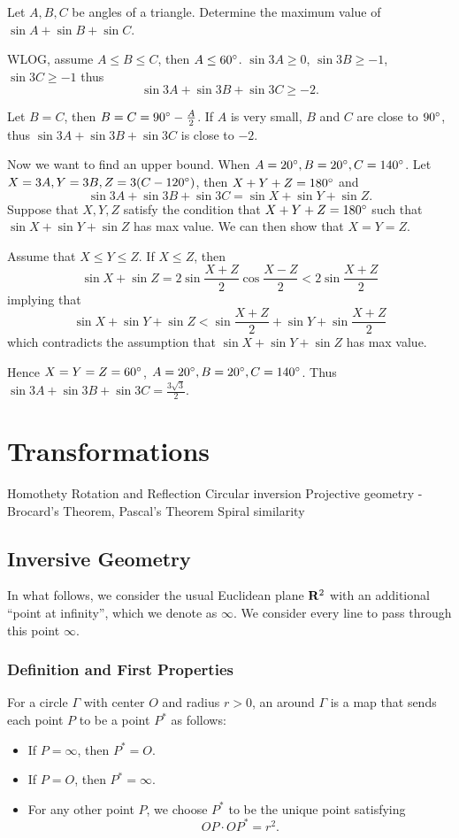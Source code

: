 \begin{prbm}
Let $A,B,C$ be angles of a triangle. Determine the maximum value of $\sin A+\sin B+\sin C$.
\end{prbm}

\begin{solution}
WLOG, assume $A\le B\le C$, then $A\le60\degree$. $\sin3A\ge0$, $\sin3B\ge-1$, $\sin3C\ge-1$ thus
\[ \sin3A+\sin3B+\sin3C\ge-2. \]

Let $B=C$, then $B=C=90\degree-\frac{A}{2}$. If $A$ is very small, $B$ and $C$ are close to $90\degree$, thus $\sin3A+\sin3B+\sin3C$ is close to $-2$.

Now we want to find an upper bound. When $A=20\degree, B=20\degree, C=140\degree$. Let $X=3A, Y=3B, Z=3(C-120\degree)$, then $X+Y+Z=180\degree$ and 
\[ \sin3A+\sin3B+\sin3C=\sin X+\sin Y+\sin Z. \]
Suppose that $X,Y,Z$ satisfy the condition that $X+Y+Z=180\degree$ such that $\sin X+\sin Y+\sin Z$ has max value. We can then show that $X=Y=Z$.

Assume that $X\le Y\le Z$. If $X\le Z$, then
\[ \sin X+\sin Z=2\sin\frac{X+Z}{2}\cos\frac{X-Z}{2}<2\sin\frac{X+Z}{2} \]
implying that
\[ \sin X+\sin Y+\sin Z<\sin\frac{X+Z}{2}+\sin Y+\sin\frac{X+Z}{2} \]
which contradicts the assumption that $\sin X+\sin Y+\sin Z$ has max value.

Hence $X=Y=Z=60\degree$, $A=20\degree, B=20\degree, C=140\degree$. Thus $\sin3A+\sin3B+\sin3C=\frac{3\sqrt{3}}{2}$.
\end{solution}

\chapter{Transformations}
Homothety
Rotation and Reflection
Circular inversion
Projective geometry - Brocard's Theorem, Pascal's Theorem
Spiral similarity
\section{Inversive Geometry}
In what follows, we consider the usual Euclidean plane $\mathbf R^2$ with an additional ``point at infinity'', which we denote as $\infty$. We consider every line to pass through this point $\infty$.

\subsection{Definition and First Properties}
\begin{definition}
For a circle $\Gamma$ with center $O$ and radius $r>0$, an  around $\Gamma$ is a map that sends each point $P$ to be a point $P^*$ as follows:
\begin{itemize}
\item If $P=\infty$, then $P^*=O$.
\item If $P=O$, then $P^*=\infty$.
\item For any other point $P$, we choose $P^*$ to be the unique point satisfying
\[ OP\cdot OP^*=r^2. \]
\end{itemize}
\end{definition}


